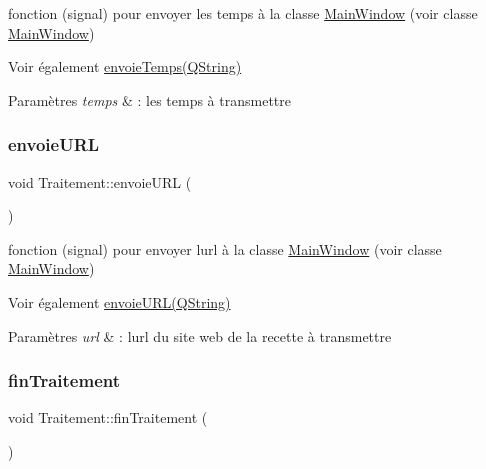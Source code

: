 fonction (signal) pour envoyer les temps à la classe \hyperlink{classMainWindow}{Main\+Window} (voir classe \hyperlink{classMainWindow}{Main\+Window}) 

\begin{DoxySeeAlso}{Voir également}
\hyperlink{classTraitement_ae57543af34e05b74a7af460c0e74e87f}{envoie\+Temps(\+Q\+String)} 
\end{DoxySeeAlso}

\begin{DoxyParams}{Paramètres}
{\em temps} & \+: les temps à transmettre \\
\hline
\end{DoxyParams}
\mbox{\label{classTraitement_acc099bf1113669c2e061e8897c3eaeca}} 
\subsubsection{\texorpdfstring{envoie\+U\+RL}{envoieURL}}
{\footnotesize\ttfamily void Traitement\+::envoie\+U\+RL (\begin{DoxyParamCaption}\item[{Q\+String}]{ }\end{DoxyParamCaption})\hspace{0.3cm}{\ttfamily [signal]}}



fonction (signal) pour envoyer l\textquotesingle{}url à la classe \hyperlink{classMainWindow}{Main\+Window} (voir classe \hyperlink{classMainWindow}{Main\+Window}) 

\begin{DoxySeeAlso}{Voir également}
\hyperlink{classTraitement_acc099bf1113669c2e061e8897c3eaeca}{envoie\+U\+R\+L(\+Q\+String)} 
\end{DoxySeeAlso}

\begin{DoxyParams}{Paramètres}
{\em url} & \+: l\textquotesingle{}url du site web de la recette à transmettre \\
\hline
\end{DoxyParams}
\mbox{\label{classTraitement_a83495c6e878e66511b8af67ee369a012}} 
\subsubsection{\texorpdfstring{fin\+Traitement}{finTraitement}}
{\footnotesize\ttfamily void Traitement\+::fin\+Traitement (\begin{DoxyParamCaption}{ }\end{DoxyParamCaption})\hspace{0.3cm}{\ttfamily [signal]}}



